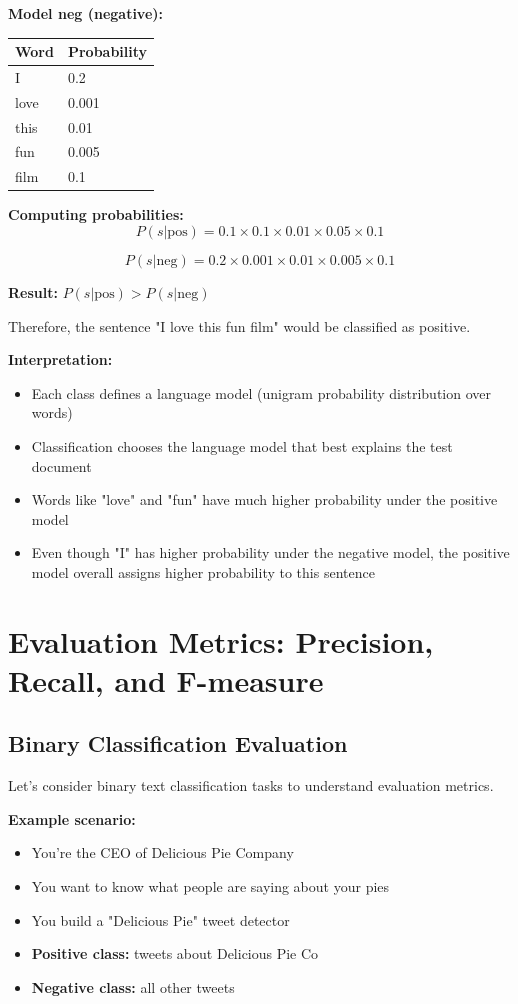 \documentclass[11pt,a4paper]{article}
\theoremstyle{definition}
\theoremstyle{plain}
\theoremstyle{remark}
\begin{document}
\textbf{Model neg (negative):}
\begin{center}
\begin{tabular}{ll}
Word & Probability \\
\hline
I & 0.2 \\
love & 0.001 \\
this & 0.01 \\
fun & 0.005 \\
film & 0.1 \\
\end{tabular}
\end{center}

\textbf{Computing probabilities:}
\[
P(s | \text{pos}) = 0.1 \times 0.1 \times 0.01 \times 0.05 \times 0.1
\]

\[
P(s | \text{neg}) = 0.2 \times 0.001 \times 0.01 \times 0.005 \times 0.1
\]

\textbf{Result:} $P(s | \text{pos}) > P(s | \text{neg})$

Therefore, the sentence "I love this fun film" would be classified as positive.

\textbf{Interpretation:}
\begin{itemize}
    \item Each class defines a language model (unigram probability distribution over words)
    \item Classification chooses the language model that best explains the test document
    \item Words like "love" and "fun" have much higher probability under the positive model
    \item Even though "I" has higher probability under the negative model, the positive model overall assigns higher probability to this sentence
\end{itemize}

\section{Evaluation Metrics: Precision, Recall, and F-measure}

\subsection{Binary Classification Evaluation}

Let's consider binary text classification tasks to understand evaluation metrics.

\textbf{Example scenario:}
\begin{itemize}
    \item You're the CEO of Delicious Pie Company
    \item You want to know what people are saying about your pies
    \item You build a "Delicious Pie" tweet detector
    \item \textbf{Positive class:} tweets about Delicious Pie Co
    \item \textbf{Negative class:} all other tweets
\end{itemize}
\end{document}

